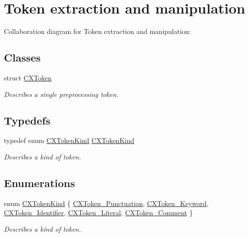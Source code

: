 \hypertarget{group__CINDEX__LEX}{}\section{Token extraction and manipulation}
\label{group__CINDEX__LEX}
Collaboration diagram for Token extraction and manipulation\+:
\subsection*{Classes}
\begin{DoxyCompactItemize}
\item 
struct \hyperlink{structCXToken}{C\+X\+Token}
\begin{DoxyCompactList}\small\item\em Describes a single preprocessing token. \end{DoxyCompactList}\end{DoxyCompactItemize}
\subsection*{Typedefs}
\begin{DoxyCompactItemize}
\item 
\mbox{\label{group__CINDEX__LEX_ga7271219ef4d52d9733d5a25aa2f49283}} 
typedef enum \hyperlink{group__CINDEX__LEX_gaf63e37eee4280e2c039829af24bbc201}{C\+X\+Token\+Kind} \hyperlink{group__CINDEX__LEX_ga7271219ef4d52d9733d5a25aa2f49283}{C\+X\+Token\+Kind}
\begin{DoxyCompactList}\small\item\em Describes a kind of token. \end{DoxyCompactList}\end{DoxyCompactItemize}
\subsection*{Enumerations}
\begin{DoxyCompactItemize}
\item 
enum \hyperlink{group__CINDEX__LEX_gaf63e37eee4280e2c039829af24bbc201}{C\+X\+Token\+Kind} \{ \newline
\hyperlink{group__CINDEX__LEX_ggaf63e37eee4280e2c039829af24bbc201a463897af21adb6706fbfcf22ca4940b7}{C\+X\+Token\+\_\+\+Punctuation}, 
\hyperlink{group__CINDEX__LEX_ggaf63e37eee4280e2c039829af24bbc201a792baee6b6a166111c89bf542a75c089}{C\+X\+Token\+\_\+\+Keyword}, 
\hyperlink{group__CINDEX__LEX_ggaf63e37eee4280e2c039829af24bbc201a439a43b4d7a9fb0333c926dabb88d710}{C\+X\+Token\+\_\+\+Identifier}, 
\hyperlink{group__CINDEX__LEX_ggaf63e37eee4280e2c039829af24bbc201aafb7fbc9035a6523463b52fe69e8a5d6}{C\+X\+Token\+\_\+\+Literal}, 
\newline
\hyperlink{group__CINDEX__LEX_ggaf63e37eee4280e2c039829af24bbc201a6a24a53d8d4a4aa6e4bcb4847c9652f3}{C\+X\+Token\+\_\+\+Comment}
 \}\begin{DoxyCompactList}\small\item\em Describes a kind of token. \end{DoxyCompactList}
\end{DoxyCompactItemize}
